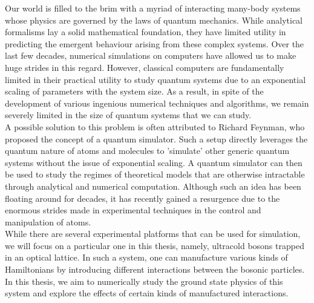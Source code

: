 Our world is filled to the brim with a myriad of interacting many-body systems whose physics are governed by the laws of quantum mechanics. While analytical formalisms lay a solid mathematical foundation, they have limited utility in predicting the emergent behaviour arising from these complex systems. Over the last few decades, numerical simulations on computers have allowed us to make huge strides in this regard. However, classical computers are fundamentally limited in their practical utility to study quantum systems due to an exponential scaling of parameters with the system size. As a result, in spite of the development of various ingenious numerical techniques and algorithms, we remain severely limited in the size of quantum systems that we can study.
\vspace{0.5cm}\\
A possible solution to this problem is often attributed to Richard Feynman\cite{feynman1982simulating}, who proposed the concept of a quantum simulator\cite{Georgescu_2014, Johnson2014}. Such a setup directly leverages the quantum nature of atoms and molecules to 'simulate' other generic quantum systems without the issue of exponential scaling. A quantum simulator can then be used to study the regimes of theoretical models that are otherwise intractable through analytical and numerical computation. Although such an idea has been floating around for decades, it has recently gained a resurgence due to the enormous strides made in experimental techniques in the control and manipulation of atoms\cite{Greiner2002, Courteille98}.  
\vspace{0.5cm}\\
While there are several experimental platforms that can be used for simulation, we will focus on a particular one in this thesis, namely, ultracold bosons trapped in an optical lattice\cite{Bloch17, Schafer20, Bloch2012, Bloch_2008}. In such a system, one can manufacture various kinds of Hamiltonians by introducing different interactions between the bosonic particles. In this thesis, we aim to numerically study the ground state physics of this system and explore the effects of certain kinds of manufactured interactions.

